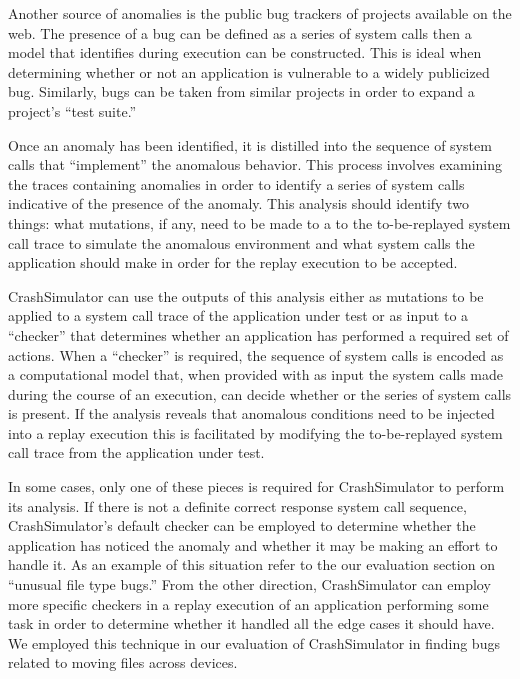     Another source of anomalies is the public bug trackers of projects available
    on the web.  The presence of a bug can be defined as a series of system
    calls then a model that identifies during execution can be constructed. This
    is ideal when determining whether or not an application is vulnerable to a
    widely publicized bug.  Similarly, bugs can be taken from similar projects
    in order to expand a project's ``test suite.''

    Once an anomaly has been identified, it is distilled into the sequence of
    system calls that ``implement'' the anomalous behavior.  This process
    involves examining the traces containing anomalies in order to identify a
    series of system calls indicative of the presence of the anomaly.  This
    analysis should identify two things: what mutations, if any, need to be made
    to a to the to-be-replayed system call trace to simulate the anomalous
    environment and what system calls the application should make in order for
    the replay execution to be accepted.

    CrashSimulator can use the outputs of this analysis either as mutations to
    be applied to a system call trace of the application under test or as input
    to a ``checker'' that determines whether an application has performed a
    required set of actions. When a ``checker'' is required, the sequence of
    system calls is encoded as a computational model that, when provided with as
    input the system calls made during the course of an execution, can decide
    whether or the series of system calls is present.  If the analysis reveals
    that anomalous conditions need to be injected into a replay execution this
    is facilitated by modifying the to-be-replayed system call trace from the
    application under test.

    In some cases, only one of these pieces is required for CrashSimulator to
    perform its analysis.  If there is not a definite correct response system
    call sequence, CrashSimulator's default checker can be employed to determine
    whether the application has noticed the anomaly and whether it may be making
    an effort to handle it.  As an example of this situation refer to the our
    evaluation section on ``unusual file type bugs.''  From the other direction,
    CrashSimulator can employ more specific checkers in a replay execution of an
    application performing some task in order to determine whether it handled
    all the edge cases it should have.  We employed this technique in our
    evaluation of CrashSimulator in finding bugs related to moving files across
    devices.

